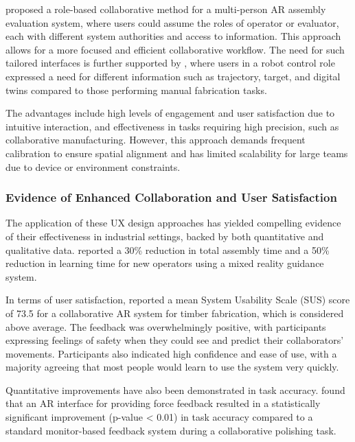 \cite{wang2022multiPerson} proposed a role-based collaborative method for a multi-person AR assembly evaluation system, where users could assume the roles of operator or evaluator, each with different system authorities and access to information. This approach allows for a more focused and efficient collaborative workflow. The need for such tailored interfaces is further supported by \cite{yang2023usability}, where users in a robot control role expressed a need for different information such as trajectory, target, and digital twins compared to those performing manual fabrication tasks.

The advantages include high levels of engagement and user satisfaction due to intuitive interaction, and effectiveness in tasks requiring high precision, such as collaborative manufacturing. However, this approach demands frequent calibration to ensure spatial alignment and has limited scalability for large teams due to device or environment constraints.

\subsubsection{Evidence of Enhanced Collaboration and User Satisfaction}

The application of these UX design approaches has yielded compelling evidence of their effectiveness in industrial settings, backed by both quantitative and qualitative data. \cite{gemito2023mixed} reported a 30\% reduction in total assembly time and a 50\% reduction in learning time for new operators using a mixed reality guidance system. 

In terms of user satisfaction, \cite{yang2023usability} reported a mean System Usability Scale (SUS) score of 73.5 for a collaborative AR system for timber fabrication, which is considered above average. The feedback was overwhelmingly positive, with participants expressing feelings of safety when they could see and predict their collaborators' movements. Participants also indicated high confidence and ease of use, with a majority agreeing that most people would learn to use the system very quickly.

Quantitative improvements have also been demonstrated in task accuracy. \cite{deFranco2019intuitive} found that an AR interface for providing force feedback resulted in a statistically significant improvement (p-value < 0.01) in task accuracy compared to a standard monitor-based feedback system during a collaborative polishing task.


